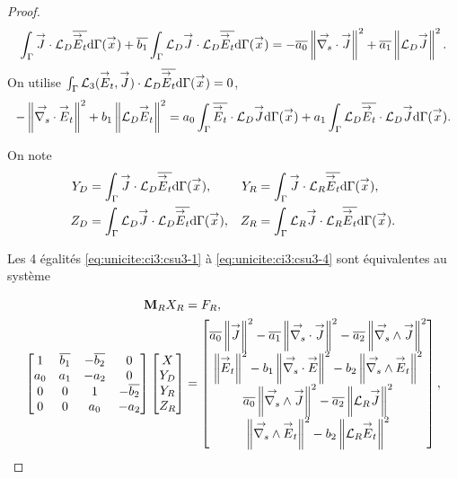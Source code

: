 \begin{proof}
\begin{equation}
      \label{eq:unicite:ci3:csu3-5}
      \int_\Gamma \vJ \cdot \LD \conj{\vE_t}\dd{\Gamma}(\vx)   + \conj{b_1} \int_\Gamma \LD \vJ \cdot \LD \conj{\vE_t}\dd{\Gamma}(\vx)
      = - \conj{a_0} \norm{\vdivs \vJ}^2 + \conj{a_1} \norm{ \LD \vJ}^2. 
    \end{equation}
    On utilise \(\int_\Gamma {\LL_3(\vE_t,\vJ)}\cdot\LD\conj{\vE_t}\dd{\Gamma}(\vx)=0\),
    \begin{equation}
      \label{eq:unicite:ci3:csu3-6}
      -\norm{ \vdivs \vE_t }^2   + {b_1} \norm{ \LD \vE_t}^2
      = a_0 \int_\Gamma \conj{\vE_t} \cdot \LD \vJ\dd{\Gamma}(\vx)  + a_1 \int_\Gamma \LD \conj{\vE_t} \cdot \LD \vJ \dd{\Gamma}(\vx).
    \end{equation}

    On note
    \begin{align*}
      Y_D &= \int_\Gamma \vJ \cdot \LD \conj{\vE_t}\dd{\Gamma}(\vx),  &
      Y_R &= \int_\Gamma \vJ \cdot \LR \conj{\vE_t} \dd{\Gamma}(\vx),
      \\
      Z_D &= \int_\Gamma \LD \vJ \cdot \LD \conj{\vE_t}\dd{\Gamma}(\vx),  &
      Z_R &= \int_\Gamma \LR \vJ \cdot \LR \conj{\vE_t} \dd{\Gamma}(\vx).
    \end{align*}

    Les 4 égalités \eqref{eq:unicite:ci3:csu3-1} à \eqref{eq:unicite:ci3:csu3-4} sont équivalentes au système

    \begin{align*}
      \mM_R X_R &= F_R,
      \\
      \begin{bmatrix}
        1 & \conj{b_1} & -\conj{b_2} & 0
        \\
        a_0 & a_1 & -a_2 & 0
        \\
        0 & 0 & 1 & -\conj{b_2}
        \\
        0 & 0 & a_0 & -a_2
        \\
      \end{bmatrix}
      \begin{bmatrix}
        X\\
        Y_D\\
        Y_R\\
        Z_R
      \end{bmatrix}
      &=
      \begin{bmatrix}
        \conj{a_0} \norm{\vJ}^2 - \conj{a_1} \norm{\vdivs \vJ}^2 - \conj{a_2} \norm{\vrots \vJ}^2
        \\
        \norm{\vE_t}^2  - b_1 \norm{\vdivs \vE}^2  - b_2 \norm{\vrots \vE_t}^2
        \\
        \conj{a_0} \norm{\vrots \vJ}^2 - \conj{a_2} \norm{\LR \vJ}^2
        \\
        \norm{\vrots \vE_t}^2 - {b_2} \norm{\LR \vE_t}^2
      \end{bmatrix},
    \end{align*}
    

\end{proof}
